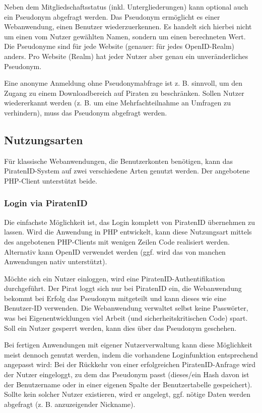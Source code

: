\documentclass[parskip=half]{scrartcl}
\begin{document}
Neben dem Mitgliedschaftsstatus (inkl. Untergliederungen) kann optional auch ein Pseudonym abgefragt werden.
Das Pseudonym ermöglicht es einer Webanwendung, einen Benutzer wiederzuerkennen.
Es handelt sich hierbei nicht um einen vom Nutzer gewählten Namen, sondern um einen berechneten Wert.
Die Pseudonyme sind für jede Website (genauer: für jedes OpenID-Realm) anders.
Pro Website (Realm) hat jeder Nutzer aber genau ein unveränderliches Pseudonym.

Eine anonyme Anmeldung ohne Pseudonymabfrage ist z. B. sinnvoll, um den Zugang zu einem Downloadbereich auf Piraten zu beschränken.
Sollen Nutzer wiedererkannt werden (z. B. um eine Mehrfachteilnahme an Umfragen zu verhindern), muss das Pseudonym abgefragt werden.

\subsection{Nutzungsarten}
Für klassische Webanwendungen, die Benutzerkonten benötigen, kann das PiratenID-System auf zwei verschiedene Arten genutzt werden.
Der angebotene PHP-Client unterstützt beide.

\subsubsection{Login via PiratenID}
Die einfachste Möglichkeit ist, das Login komplett von PiratenID übernehmen zu lassen.
Wird die Anwendung in PHP entwickelt, kann diese Nutzungsart mittels des angebotenen PHP-Clients mit wenigen Zeilen Code realisiert werden.
Alternativ kann OpenID verwendet werden (ggf. wird das von manchen Anwendungen nativ unterstützt).

Möchte sich ein Nutzer einloggen, wird eine PiratenID-Authentifikation durchgeführt.
Der Pirat loggt sich nur bei PiratenID ein, die Webanwendung bekommt bei Erfolg das Pseudonym mitgeteilt und kann dieses wie eine Benutzer-ID verwenden.
Die Webanwendung verwaltet selbst keine Passwörter, was bei Eigenentwicklungen viel Arbeit (und sicherheitskritischen Code) spart.
Soll ein Nutzer gesperrt werden, kann dies über das Pseudonym geschehen.

Bei fertigen Anwendungen mit eigener Nutzerverwaltung kann diese Möglichkeit meist dennoch genutzt werden, indem die vorhandene Loginfunktion entsprechend angepasst wird:
Bei der Rückkehr von einer erfolgreichen PiratenID-Anfrage wird der Nutzer eingeloggt, zu dem das Pseudonym passt
(dieses/ein Hash davon ist der Benutzername oder in einer eigenen Spalte der Benutzertabelle gespeichert).
Sollte kein solcher Nutzer existieren, wird er angelegt, ggf. nötige Daten werden abgefragt (z. B. anzuzeigender Nickname).
\end{document}
